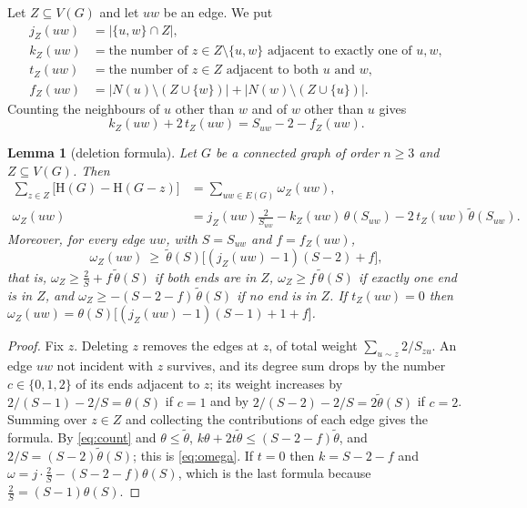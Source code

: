 \documentclass[11pt]{article}
\newtheorem{lemma}[theorem]{Lemma}
\theoremstyle{definition}
\theoremstyle{remark}
\newcommand{\Hm}{\mathrm{H}}
\newcommand{\tht}{\theta}
\newcommand{\tth}{\tilde\theta}
\begin{document}
Let $Z\subseteq V(G)$ and let $uw$ be an edge. We put
\begin{align*}
 j_Z(uw)&=|\{u,w\}\cap Z| ,\\
 k_Z(uw)&=\text{the number of $z\in Z\setminus\{u,w\}$ adjacent to exactly one of $u,w$},\\
 t_Z(uw)&=\text{the number of $z\in Z$ adjacent to both $u$ and $w$},\\
 f_Z(uw)&=|N(u)\setminus(Z\cup\{w\})|+|N(w)\setminus(Z\cup\{u\})| .
\end{align*}
Counting the neighbours of $u$ other than $w$ and of $w$ other than $u$ gives
\begin{equation}\label{eq:count}
 k_Z(uw)+2\,t_Z(uw)=S_{uw}-2-f_Z(uw).
\end{equation}

\begin{lemma}[deletion formula]\label{lem:deletion}
Let $G$ be a connected graph of order $n\ge3$ and $Z\subseteq V(G)$. Then
\begin{align*}
 \sum_{z\in Z}\bigl[\Hm(G)-\Hm(G-z)\bigr]&=\sum_{uw\in E(G)}\omega_Z(uw),\\
 \omega_Z(uw)&=j_Z(uw)\frac{2}{S_{uw}}-k_Z(uw)\,\tht(S_{uw})-2\,t_Z(uw)\,\tth(S_{uw}).
\end{align*}
Moreover, for every edge $uw$, with $S=S_{uw}$ and $f=f_Z(uw)$,
\begin{equation}\label{eq:omega}
 \omega_Z(uw)\ \ge\ \tth(S)\bigl[(j_Z(uw)-1)(S-2)+f\bigr],
\end{equation}
that is, $\omega_Z\ge \frac2S+f\,\tth(S)$ if both ends are in $Z$, $\omega_Z\ge f\,\tth(S)$ if
exactly one end is in $Z$, and $\omega_Z\ge-(S-2-f)\,\tth(S)$ if no end is in $Z$. If
$t_Z(uw)=0$ then $\omega_Z(uw)=\tht(S)\bigl[(j_Z(uw)-1)(S-1)+1+f\bigr]$.
\end{lemma}
\begin{proof}
Fix $z$. Deleting $z$ removes the edges at $z$, of total weight $\sum_{u\sim z}2/S_{zu}$. An
edge $uw$ not incident with $z$ survives, and its degree sum drops by the number
$c\in\{0,1,2\}$ of its ends adjacent to $z$; its weight increases by $2/(S-1)-2/S=\tht(S)$ if
$c=1$ and by $2/(S-2)-2/S=2\tth(S)$ if $c=2$. Summing over $z\in Z$ and collecting the
contributions of each edge gives the formula. By \eqref{eq:count} and $\tht\le\tth$,
$k\tht+2t\tth\le(S-2-f)\tth$, and $2/S=(S-2)\tth(S)$; this is \eqref{eq:omega}. If $t=0$ then
$k=S-2-f$ and $\omega=j\cdot\frac2S-(S-2-f)\tht(S)$, which is the last formula because
$\frac2S=(S-1)\tht(S)$.
\end{proof}
\end{document}
